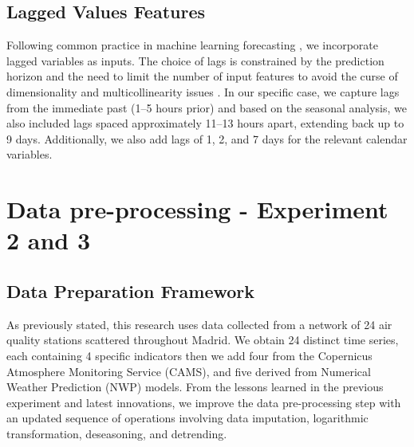 \documentclass[12pt,a4paper]{book}
\begin{document}
\subsection{Lagged Values Features}
Following common practice in machine learning forecasting \citep{hyndman2021}, we incorporate lagged variables as inputs. The choice of lags is constrained by the prediction horizon and the need to limit the number of input features to avoid the curse of dimensionality \citep{bishop2006} and multicollinearity issues \cite{gujarati2009}. In our specific case, we capture lags from the immediate past (1–5 hours prior) and based on the seasonal analysis, we also included lags spaced approximately 11–13 hours apart, extending back up to 9 days. Additionally, we also add lags of 1, 2, and 7 days for the relevant calendar variables.

\section{Data pre-processing - Experiment 2 and 3}

\subsection{Data Preparation Framework}
\label{data:pre-processing} 
As previously stated, this research uses data collected from a network of 24 air quality stations scattered throughout Madrid. We obtain 24 distinct time series, each containing 4 specific indicators then we add four from the Copernicus Atmosphere Monitoring Service (CAMS), and five derived from Numerical Weather Prediction (NWP) models. From the lessons learned in the previous experiment and latest innovations, we improve the data pre-processing step with an updated sequence of operations involving data imputation, logarithmic transformation, deseasoning, and detrending. 
\end{document}

